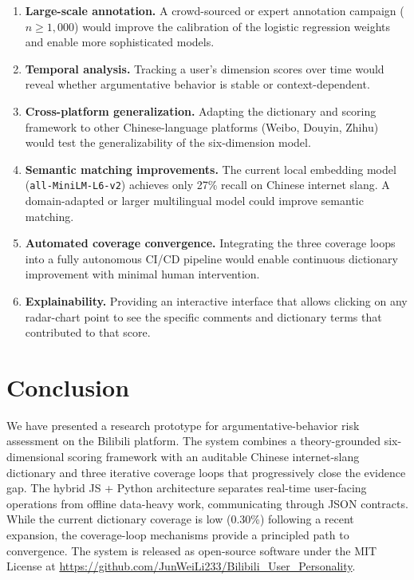 \documentclass[11pt,a4paper]{article}
\begin{document}
\begin{enumerate}
  \item \textbf{Large-scale annotation.} A crowd-sourced or expert annotation campaign
    ($n \geq 1,\!000$) would improve the calibration of the logistic regression weights
    and enable more sophisticated models.
  \item \textbf{Temporal analysis.} Tracking a user's dimension scores over time would
    reveal whether argumentative behavior is stable or context-dependent.
  \item \textbf{Cross-platform generalization.} Adapting the dictionary and scoring
    framework to other Chinese-language platforms (Weibo, Douyin, Zhihu) would test
    the generalizability of the six-dimension model.
  \item \textbf{Semantic matching improvements.} The current local embedding model
    (\texttt{all-MiniLM-L6-v2}) achieves only 27\% recall on Chinese internet slang.
    A domain-adapted or larger multilingual model could improve semantic matching.
  \item \textbf{Automated coverage convergence.} Integrating the three coverage loops
    into a fully autonomous CI/CD pipeline would enable continuous dictionary
    improvement with minimal human intervention.
  \item \textbf{Explainability.} Providing an interactive interface that allows clicking
    on any radar-chart point to see the specific comments and dictionary terms
    that contributed to that score.
\end{enumerate}


\section{Conclusion}

We have presented a research prototype for argumentative-behavior risk assessment
on the Bilibili platform. The system combines a theory-grounded six-dimensional
scoring framework with an auditable Chinese internet-slang dictionary and three
iterative coverage loops that progressively close the evidence gap. The hybrid
JS + Python architecture separates real-time user-facing operations from offline
data-heavy work, communicating through JSON contracts. While the current
dictionary coverage is low (0.30\%) following a recent expansion, the coverage-loop
mechanisms provide a principled path to convergence. The system is released as
open-source software under the MIT License at
\url{https://github.com/JunWeiLi233/Bilibili_User_Personality}.
\end{document}
